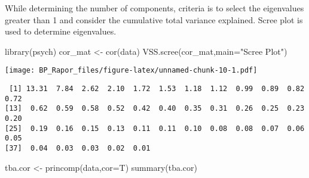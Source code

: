 \documentclass[12pt,twoside]{deuthesis}
\newenvironment{Shaded}{\begin{snugshade}}{\end{snugshade}}
\newcommand{\AttributeTok}[1]{\textcolor[rgb]{0.77,0.63,0.00}{#1}}
\newcommand{\DecValTok}[1]{\textcolor[rgb]{0.00,0.00,0.81}{#1}}
\newcommand{\FunctionTok}[1]{\textcolor[rgb]{0.00,0.00,0.00}{#1}}
\newcommand{\NormalTok}[1]{#1}
\newcommand{\OtherTok}[1]{\textcolor[rgb]{0.56,0.35,0.01}{#1}}
\newcommand{\SpecialCharTok}[1]{\textcolor[rgb]{0.00,0.00,0.00}{#1}}
\newcommand{\StringTok}[1]{\textcolor[rgb]{0.31,0.60,0.02}{#1}}
\begin{document}
While determining the number of components, criteria is to select the eigenvalues greater than 1 and consider the cumulative total variance explained.
Scree plot is used to determine eigenvalues.
\begin{Shaded}
\begin{Highlighting}[]
\FunctionTok{library}\NormalTok{(psych)}
\NormalTok{cor\_mat }\OtherTok{\textless{}{-}} \FunctionTok{cor}\NormalTok{(data)}
\FunctionTok{VSS.scree}\NormalTok{(cor\_mat,}\AttributeTok{main=}\StringTok{"Scree Plot"}\NormalTok{)}
\end{Highlighting}
\end{Shaded}
\texttt{[image: BP\_Rapor\_files/figure-latex/unnamed-chunk-10-1.pdf]}
\begin{Shaded}
\end{Shaded}
\begin{verbatim}
 [1] 13.31  7.84  2.62  2.10  1.72  1.53  1.18  1.12  0.99  0.89  0.82  0.72
[13]  0.62  0.59  0.58  0.52  0.42  0.40  0.35  0.31  0.26  0.25  0.23  0.20
[25]  0.19  0.16  0.15  0.13  0.11  0.11  0.10  0.08  0.08  0.07  0.06  0.05
[37]  0.04  0.03  0.03  0.02  0.01
\end{verbatim}
\begin{Shaded}
\begin{Highlighting}[]
\NormalTok{tba.cor }\OtherTok{\textless{}{-}} \FunctionTok{princomp}\NormalTok{(data,}\AttributeTok{cor=}\NormalTok{T)}
\FunctionTok{summary}\NormalTok{(tba.cor)}
\end{Highlighting}
\end{Shaded}
\end{document}
